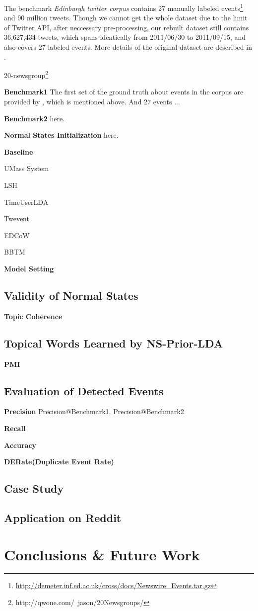 \documentclass[conference,compsoc]{IEEEtran}
\begin{document}
The benchmark \textit{Edinburgh twitter corpus} contains 27 manually labeled events\cite{petrovic2013can}\footnote{\url{http://demeter.inf.ed.ac.uk/cross/docs/Newswire_Events.tar.gz}} and 90 million tweets. Though we cannot get the whole dataset due to the limit of Twitter API, after neccessary pre-processing, our rebuilt dataset still contains 36,627,434 tweets, which spans identically from 2011/06/30 to 2011/09/15, and also covers 27 labeled events.
More details of the original dataset are described in \cite{petrovic2010edinburgh}.

20-newsgroup\footnote{http://qwone.com/~jason/20Newsgroups/}

\textbf{Benchmark1} The first set of the ground truth about events in the corpus are provided by \cite{petrovic2013can}, which is mentioned above. 
And 27 events ...

\textbf{Benchmark2} here.

\textbf{Normal States Initialization} here.

\textbf{Baseline}

UMass System\cite{Allan:2000wu}

LSH

TimeUserLDA

Twevent

EDCoW

BBTM\cite{yan2015probabilistic}

\textbf{Model Setting}

\subsection{Validity of Normal States}
\textbf{Topic Coherence} \cite{roder2015exploring}
\subsection{Topical Words Learned by NS-Prior-LDA}
\textbf{PMI}
\subsection{Evaluation of Detected Events}
\textbf{Precision} Precision@Benchmark1, Precision@Benchmark2

\textbf{Recall}

\textbf{Accuracy}

\textbf{DERate(Duplicate Event Rate)}
\subsection{Case Study}


\subsection{Application on Reddit}

\section{Conclusions \& Future Work}



  
\end{document}

